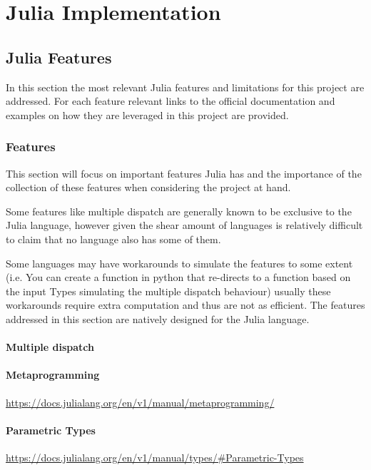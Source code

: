 \chapter{Julia Implementation}
\label{ch4}

\singlespacing %
\minitoc %
\doublespacing %


\section{Julia Features}
In this section the most relevant Julia features and limitations for this project are addressed. For each feature relevant links to the official documentation and examples on how they are leveraged in this project are provided.

\subsection{Features}
This section will focus on important features Julia has and the importance of the collection of these features when considering the project at hand.

Some features like multiple dispatch are generally known to be exclusive to the Julia language, however given the shear amount of languages is relatively difficult to claim that no language also has some of them.

Some languages may have workarounds to simulate the features to some extent (i.e. You can create a function in python that re-directs to a function based on the input Types simulating the multiple dispatch behaviour) usually these workarounds require extra computation and thus are not as efficient. The features addressed in this section are natively designed for the Julia language.

\subsubsection{Multiple dispatch}
\cite{julia_performance_tips_multiple_dispatch}

\subsubsection{Metaprogramming}
\url{https://docs.julialang.org/en/v1/manual/metaprogramming/}

\subsubsection{Parametric Types}
\url{https://docs.julialang.org/en/v1/manual/types/#Parametric-Types}

